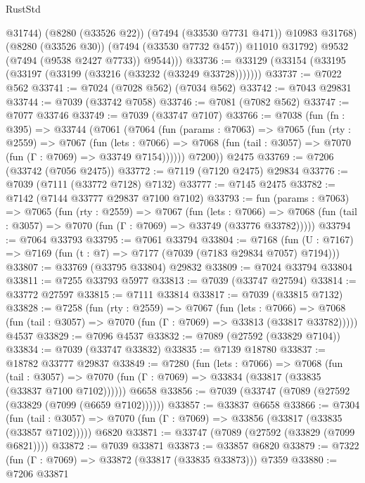 \begin{lexlean}{RustStd}
\begin{coremodule}
                @31744)
              (@8280 (@33526 @22))
              (@7494 (@33530 @7731 @471))
              @10983
              @31768)
            (@8280 (@33526 @30))
            (@7494 (@33530 @7732 @457))
            @11010
            @31792)
          @9532
          (@7494 (@9538 @2427 @7733))
          @9544)))
@33736 := @33129 (@33154 (@33195 (@33197 (@33199 (@33216 (@33232 (@33249 @33728)))))))
@33737 := @7022 @562
@33741 := @7024 (@7028 @562) (@7034 @562)
@33742 := @7043 @29831
@33744 := @7039 (@33742 @7058)
@33746 := @7081 (@7082 @562)
@33747 := @7077 @33746
@33749 := @7039 (@33747 @7107)
@33766 := @7038
    (fun (fn : @395) =>
    @33744
      (@7061
        (@7064
          (fun (params : @7063) =>
          @7065
            (fun (rty : @2559) =>
            @7067
              (fun (lets : @7066) =>
              @7068 (fun (tail : @3057) => @7070 (fun (Γ : @7069) => @33749 @7154))))))
        @7200))
    @2475
@33769 := @7206 (@33742 (@7056 @2475))
@33772 := @7119 (@7120 @2475) @29834
@33776 := @7039 (@7111 (@33772 @7128) @7132)
@33777 := @7145 @2475
@33782 := @7142 (@7144 @33777 @29837 @7100 @7102)
@33793 := fun (params : @7063) =>
  @7065
    (fun (rty : @2559) =>
    @7067
      (fun (lets : @7066) =>
      @7068 (fun (tail : @3057) => @7070 (fun (Γ : @7069) => @33749 (@33776 @33782)))))
@33794 := @7064 @33793
@33795 := @7061 @33794
@33804 := @7168
    (fun (U : @7167) => @7169 (fun (t : @7) => @7177 (@7039 (@7183 @29834 @7057) @7194)))
@33807 := @33769 (@33795 @33804) @29832
@33809 := @7024 @33794 @33804
@33811 := @7255 @33793 @5977
@33813 := @7039 (@33747 @27594)
@33814 := @33772 @27597
@33815 := @7111 @33814
@33817 := @7039 (@33815 @7132)
@33828 := @7258
    (fun (rty : @2559) =>
    @7067
      (fun (lets : @7066) =>
      @7068 (fun (tail : @3057) => @7070 (fun (Γ : @7069) => @33813 (@33817 @33782)))))
    @4537
@33829 := @7096 @4537
@33832 := @7089 (@27592 (@33829 @7104))
@33834 := @7039 (@33747 @33832)
@33835 := @7139 @18780
@33837 := @18782 @33777 @29837
@33849 := @7280
    (fun (lets : @7066) =>
    @7068
      (fun (tail : @3057) =>
      @7070 (fun (Γ : @7069) => @33834 (@33817 (@33835 (@33837 @7100 @7102))))))
    @6658
@33856 := @7039 (@33747 (@7089 (@27592 (@33829 (@7099 (@6659 @7102))))))
@33857 := @33837 @6658
@33866 := @7304
    (fun (tail : @3057) => @7070 (fun (Γ : @7069) => @33856 (@33817 (@33835 (@33857 @7102)))))
    @6820
@33871 := @33747 (@7089 (@27592 (@33829 (@7099 @6821))))
@33872 := @7039 @33871
@33873 := @33857 @6820
@33879 := @7322 (fun (Γ : @7069) => @33872 (@33817 (@33835 @33873))) @7359
@33880 := @7206 @33871

\end{coremodule}
\end{lexlean}
